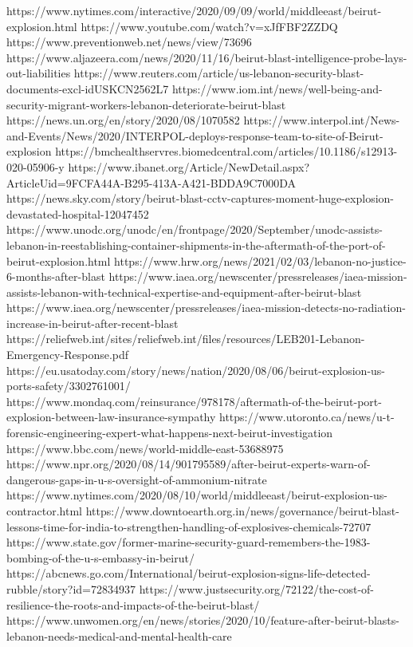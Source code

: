 https://www.nytimes.com/interactive/2020/09/09/world/middleeast/beirut-explosion.html
https://www.youtube.com/watch?v=xJfFBF2ZZDQ
https://www.preventionweb.net/news/view/73696
https://www.aljazeera.com/news/2020/11/16/beirut-blast-intelligence-probe-lays-out-liabilities
https://www.reuters.com/article/us-lebanon-security-blast-documents-excl-idUSKCN2562L7
https://www.iom.int/news/well-being-and-security-migrant-workers-lebanon-deteriorate-beirut-blast
https://news.un.org/en/story/2020/08/1070582
https://www.interpol.int/News-and-Events/News/2020/INTERPOL-deploys-response-team-to-site-of-Beirut-explosion
https://bmchealthservres.biomedcentral.com/articles/10.1186/s12913-020-05906-y
https://www.ibanet.org/Article/NewDetail.aspx?ArticleUid=9FCFA44A-B295-413A-A421-BDDA9C7000DA
https://news.sky.com/story/beirut-blast-cctv-captures-moment-huge-explosion-devastated-hospital-12047452
https://www.unodc.org/unodc/en/frontpage/2020/September/unodc-assists-lebanon-in-reestablishing-container-shipments-in-the-aftermath-of-the-port-of-beirut-explosion.html
https://www.hrw.org/news/2021/02/03/lebanon-no-justice-6-months-after-blast
https://www.iaea.org/newscenter/pressreleases/iaea-mission-assists-lebanon-with-technical-expertise-and-equipment-after-beirut-blast
https://www.iaea.org/newscenter/pressreleases/iaea-mission-detects-no-radiation-increase-in-beirut-after-recent-blast
https://reliefweb.int/sites/reliefweb.int/files/resources/LEB201-Lebanon-Emergency-Response.pdf
https://eu.usatoday.com/story/news/nation/2020/08/06/beirut-explosion-us-ports-safety/3302761001/
https://www.mondaq.com/reinsurance/978178/aftermath-of-the-beirut-port-explosion-between-law-insurance-sympathy
https://www.utoronto.ca/news/u-t-forensic-engineering-expert-what-happens-next-beirut-investigation
https://www.bbc.com/news/world-middle-east-53688975
https://www.npr.org/2020/08/14/901795589/after-beirut-experts-warn-of-dangerous-gaps-in-u-s-oversight-of-ammonium-nitrate
https://www.nytimes.com/2020/08/10/world/middleeast/beirut-explosion-us-contractor.html
https://www.downtoearth.org.in/news/governance/beirut-blast-lessons-time-for-india-to-strengthen-handling-of-explosives-chemicals-72707
https://www.state.gov/former-marine-security-guard-remembers-the-1983-bombing-of-the-u-s-embassy-in-beirut/
https://abcnews.go.com/International/beirut-explosion-signs-life-detected-rubble/story?id=72834937
https://www.justsecurity.org/72122/the-cost-of-resilience-the-roots-and-impacts-of-the-beirut-blast/
https://www.unwomen.org/en/news/stories/2020/10/feature-after-beirut-blasts-lebanon-needs-medical-and-mental-health-care
